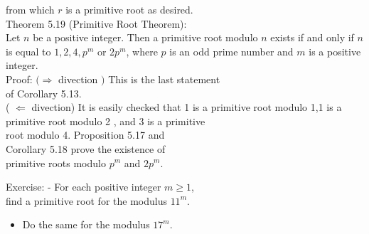 \documentclass[10pt]{article}
\begin{document}
from which $r$ is a primitive root as desired.\\
Theorem 5.19 (Primitive Root Theorem):\\
Let $n$ be a positive integer. Then a primitive root modulo $n$ exists if and only if $n$ is equal to $1,2,4, p^{m}$ or $2 p^{m}$, where $p$ is an odd prime number and $m$ is a positive integer.\\
Proof: $(\Rightarrow$ divection $)$ This is the last statement\\
of Corollary 5.13.\\
( $\Leftarrow$ divection) It is easily checked that 1 is a primitive root modulo 1,1 is a\\
primitive root modulo 2 , and 3 is a primitive\\
root modulo 4. Proposition 5.17 and\\
Corollary 5.18 prove the existence of\\
primitive roots modulo $p^{m}$ and $2 p^{m}$.

Exercise: - For each positive integer $m \geqslant 1$,\\
find a primitive root for the modulus $11^{m}$.

\begin{itemize}
  \item Do the same for the modulus $17^{m}$.
\end{itemize}
\end{document}
